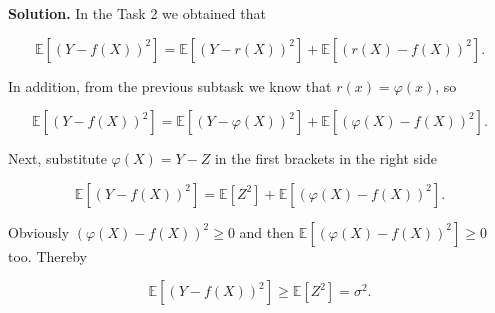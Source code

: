 \documentclass{article}
\begin{document}
\bigskip

\textbf{Solution.} In the Task 2 we obtained that

$$\mathbb E[(Y - f(X))^2] = \mathbb E[(Y - r(X))^2] + \mathbb E[(r(X) - f(X))^2].$$

In addition, from the previous subtask we know that $r(x) = \varphi(x)$, so

$$\mathbb E[(Y - f(X))^2] = \mathbb E[(Y - \varphi(X))^2] + \mathbb E[(\varphi(X) - f(X))^2].$$

Next, substitute $\varphi(X) = Y - Z$ in the first brackets in the right side

$$\mathbb E[(Y - f(X))^2] = \mathbb E[Z^2] + \mathbb E[(\varphi(X) - f(X))^2].$$

Obviously $(\varphi(X) - f(X))^2 \geq 0$ and then $\mathbb E[(\varphi(X) - f(X))^2] \geq 0$ too. Thereby

$$\mathbb E[(Y - f(X))^2] \geq \mathbb E[Z^2] = \sigma^2.$$
\end{document}

